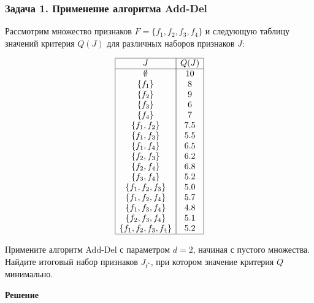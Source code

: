 \subsubsection*{Задача 1. Применение алгоритма Add-Del}

Рассмотрим множество признаков \( F = \{f_1, f_2, f_3, f_4\} \) и следующую таблицу значений критерия \( Q(J) \) для различных наборов признаков \( J \):

\[
\begin{array}{|c|c|}
\hline
J & Q(J) \\
\hline
\emptyset & 10 \\
\{f_1\} & 8 \\
\{f_2\} & 9 \\
\{f_3\} & 6 \\
\{f_4\} & 7 \\
\{f_1, f_2\} & 7.5 \\
\{f_1, f_3\} & 5.5 \\
\{f_1, f_4\} & 6.5 \\
\{f_2, f_3\} & 6.2 \\
\{f_2, f_4\} & 6.8 \\
\{f_3, f_4\} & 5.2 \\
\{f_1, f_2, f_3\} & 5.0 \\
\{f_1, f_2, f_4\} & 5.7 \\
\{f_1, f_3, f_4\} & 4.8 \\
\{f_2, f_3, f_4\} & 5.1 \\
\{f_1, f_2, f_3, f_4\} & 5.2 \\
\hline
\end{array}
\]

Примените алгоритм Add-Del с параметром \( d = 2 \), начиная с пустого множества. Найдите итоговый набор признаков \( J_{t^*} \), при котором значение критерия \( Q \) минимально.

\bigskip

\textbf{Решение}



